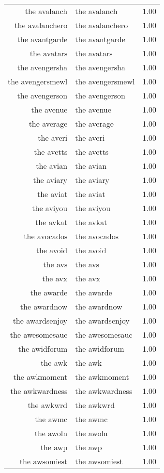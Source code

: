 \begin{table}[ht]
\begin{tabular}{rlr}
  the avalanch & the avalanch & 1.00 \\ 
  the avalanchero & the avalanchero & 1.00 \\ 
  the avantgarde & the avantgarde & 1.00 \\ 
  the avatars & the avatars & 1.00 \\ 
  the avengersha & the avengersha & 1.00 \\ 
  the avengersmewl & the avengersmewl & 1.00 \\ 
  the avengerson & the avengerson & 1.00 \\ 
  the avenue & the avenue & 1.00 \\ 
  the average & the average & 1.00 \\ 
  the averi & the averi & 1.00 \\ 
  the avetts & the avetts & 1.00 \\ 
  the avian & the avian & 1.00 \\ 
  the aviary & the aviary & 1.00 \\ 
  the aviat & the aviat & 1.00 \\ 
  the aviyou & the aviyou & 1.00 \\ 
  the avkat & the avkat & 1.00 \\ 
  the avocados & the avocados & 1.00 \\ 
  the avoid & the avoid & 1.00 \\ 
  the avs & the avs & 1.00 \\ 
  the avx & the avx & 1.00 \\ 
  the awarde & the awarde & 1.00 \\ 
  the awardnow & the awardnow & 1.00 \\ 
  the awardsenjoy & the awardsenjoy & 1.00 \\ 
  the awesomesauc & the awesomesauc & 1.00 \\ 
  the awidforum & the awidforum & 1.00 \\ 
  the awk & the awk & 1.00 \\ 
  the awkmoment & the awkmoment & 1.00 \\ 
  the awkwardness & the awkwardness & 1.00 \\ 
  the awkwrd & the awkwrd & 1.00 \\ 
  the awmc & the awmc & 1.00 \\ 
  the awoln & the awoln & 1.00 \\ 
  the awp & the awp & 1.00 \\ 
  the awsomiest & the awsomiest & 1.00 \\ 

\end{tabular}
\end{table}
